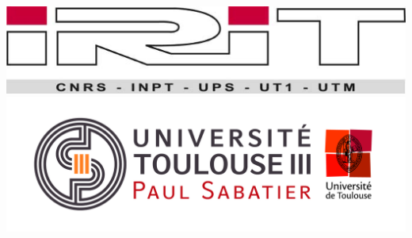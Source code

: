 \documentclass{book}
\begin{document}
\begin{center}
  \includegraphics[scale=0.125]{005_logo_irit}
  \includegraphics[scale=0.0425]{006_logo_univ_toulouse}
\end{center}
\end{document}
